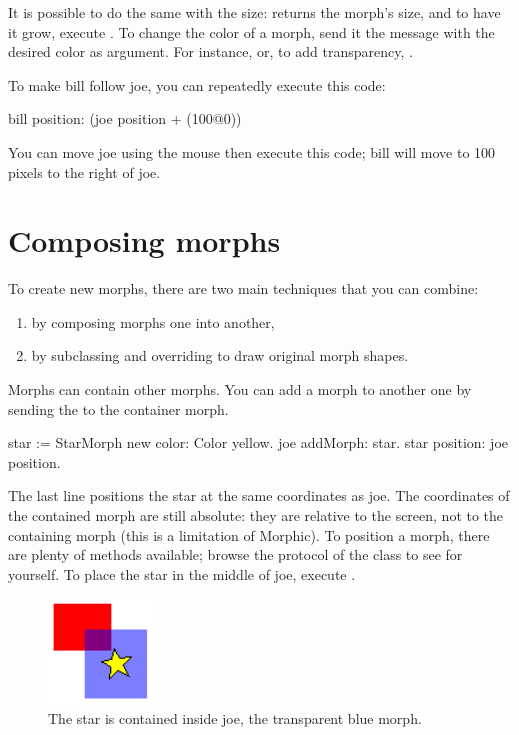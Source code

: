 \documentclass[a4paper,10pt,twoside]{book}
\begin{document}
It is possible to do the same with the size:   returns the morph's size, and to have it grow, execute .
To change the color of a morph, send it the  message with the desired color as argument. For instance,  or, to add transparency, .

To make bill follow joe, you can repeatedly execute this code:
\begin{code}{}
bill position: (joe position + (100@0))
\end{code}
\noindent
You can move joe using the mouse then execute this code; bill will move to 100 pixels to the right of joe.

\section{Composing morphs}

To create new morphs, there are two main techniques that you can combine:
\begin{enumerate}
	\item by composing morphs one into another,
	\item by subclassing  and overriding  to draw original morph shapes.
\end{enumerate}

Morphs can contain other morphs. You can add a morph to another one by sending the  to the container morph.

\begin{code}{}
star := StarMorph new color: Color yellow.
joe addMorph: star.
star position: joe position.
\end{code}
\noindent
The last line positions the star at the same coordinates as joe.
The coordinates of the contained morph are still absolute: they are relative to the screen, not to the containing morph (this is a limitation of Morphic).
To position a morph, there are plenty of methods available; browse the  protocol of the  class to see for yourself.
To place the star in the middle of joe, execute   .

\begin{figure}[ht]
	\centerline{\includegraphics{joeStar}}
	\caption{The star is contained inside joe, the transparent blue morph.
		\label{fig:joeStar}}
\end{figure}
\end{document}
